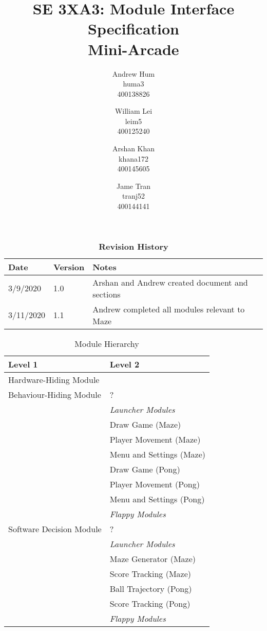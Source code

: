 \documentclass[12pt, titlepage]{article}
\title{SE 3XA3: Module Interface Specification\\Mini-Arcade}
\author{Andrew Hum \\ huma3 \\ 400138826 \and
		William Lei \\ leim5 \\ 400125240 \and
		Arshan Khan \\ khana172 \\ 400145605 \and
		Jame Tran \\ tranj52 \\ 400144141
}
\date{}
\begin{document}
\newpage

\maketitle
\maketitle
\newpage
\tableofcontents

\begin{table}[bp]
\caption{\bf Revision History}
\begin{tabularx}{\textwidth}{p{3cm}p{2cm}X}
\toprule {\bf Date} & {\bf Version} & {\bf Notes}\\
\midrule
3/9/2020 & 1.0 & Arshan and Andrew created document and sections\\
3/11/2020 & 1.1 & Andrew completed all modules relevant to Maze\\
\bottomrule
\end{tabularx}
\end{table}

\newpage

\begin{table}[h!]
    \centering
    \begin{tabular}{p{} p{}}
    \toprule
    \textbf{Level 1} & \textbf{Level 2}\\
    \midrule
        {Hardware-Hiding Module} & ~ \\
    \midrule
        \multirow{1}{0.3\textwidth}{Behaviour-Hiding Module} & ?\\
        & \textit{Launcher Modules}\\
        & Draw Game (Maze)\\
        & Player Movement (Maze)\\
        & Menu and Settings (Maze)\\ 
        & Draw Game (Pong)\\
        & Player Movement (Pong)\\
        & Menu and Settings (Pong)\\ 
        & \textit{Flappy Modules}\\
    \midrule
        \multirow{1}{0.3\textwidth}{Software Decision Module} & {?}\\
        & \textit{Launcher Modules}\\
        & Maze Generator (Maze)\\
        & Score Tracking (Maze)\\ 
        & Ball Trajectory (Pong)\\
        & Score Tracking (Pong) \\ 
        & \textit{Flappy Modules}\\
    \bottomrule
\end{tabular}
\caption{Module Hierarchy}
\label{TblMH}
\end{table}
\end{document}

